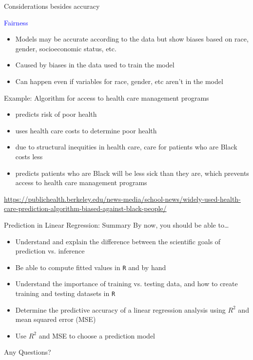 \documentclass[10pt,t]{beamer}
\begin{document}
\begin{frame}{Considerations besides accuracy}
	\vspace{-5 mm}
	
	\textcolor{blue}{Fairness}
	\medskip
	\begin{itemize}
		\item Models may be accurate according to the data but show biases based on race, gender, socioeconomic status, etc.
		\medskip
		\item Caused by biases in the data used to train the model
		\medskip
		\item Can happen even if variables for race, gender, etc aren't in the model
	\end{itemize}
\medskip

Example: Algorithm for access to health care management programs
\medskip

\begin{itemize}
	\item predicts risk of poor health
	\medskip
	\item uses health care costs to determine poor health
	\medskip
	
	\item due to structural inequities in health care, care for patients who are Black costs less
	\medskip
	
	\item predicts patients who are Black will be less sick than they are, which prevents access to health care management programs
\end{itemize}
\bigskip

\scriptsize{\url{https://publichealth.berkeley.edu/news-media/school-news/widely-used-health-care-prediction-algorithm-biased-against-black-people/}}


	
\end{frame}


\begin{frame}{Prediction in Linear Regression: Summary}
By now, you should be able to\dots

\vspace{0.3cm}
\begin{itemize}
	\item Understand and explain the difference between the scientific goals of prediction vs. inference
	\item Be able to compute fitted values in \texttt{R} and by hand
	\item Understand the importance of training vs. testing data, and how to create training and testing datasets in \texttt{R}
	\item Determine the predictive accuracy of a linear regression analysis using $R^2$ and mean squared error (MSE)
	\item Use $R^2$ and MSE to choose a prediction model
\end{itemize}
\end{frame}




\begin{frame}[c]
\centering \huge Any Questions?
\end{frame}
\end{document}
